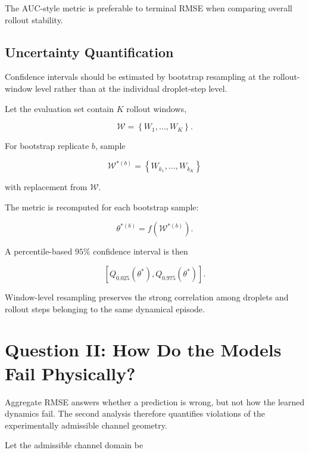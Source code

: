 \documentclass[11pt]{article}
\begin{document}
The AUC-style metric is preferable to terminal RMSE when comparing overall rollout stability.

\subsection{Uncertainty Quantification}

Confidence intervals should be estimated by bootstrap resampling at the rollout-window level rather than at the individual droplet-step level.

Let the evaluation set contain \(K\) rollout windows,

\begin{equation}
\mathcal{W}
=
\left\{
W_1,\ldots,W_K
\right\}.
\end{equation}

For bootstrap replicate \(b\), sample

\begin{equation}
\mathcal{W}^{*(b)}
=
\left\{
W_{k_1},\ldots,W_{k_K}
\right\}
\end{equation}

with replacement from \(\mathcal{W}\).

The metric is recomputed for each bootstrap sample:

\begin{equation}
\theta^{*(b)}
=
f\left(
\mathcal{W}^{*(b)}
\right).
\end{equation}

A percentile-based \(95\%\) confidence interval is then

\begin{equation}
\left[
Q_{0.025}
\left(
\theta^*
\right),
Q_{0.975}
\left(
\theta^*
\right)
\right].
\end{equation}

Window-level resampling preserves the strong correlation among droplets and rollout steps belonging to the same dynamical episode.

\section{Question II: How Do the Models Fail Physically?}

Aggregate RMSE answers whether a prediction is wrong, but not how the learned dynamics fail. The second analysis therefore quantifies violations of the experimentally admissible channel geometry.

Let the admissible channel domain be
\end{document}
